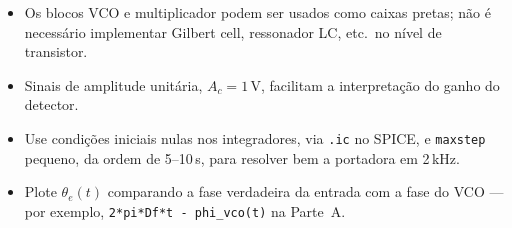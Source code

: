 \documentclass[11pt,a4paper]{article}
\begin{document}
\begin{atencao}[Observações]
\begin{itemize}[leftmargin=1.5em]
  \item Os blocos VCO e multiplicador podem ser usados como caixas pretas; não é necessário
        implementar Gilbert cell, ressonador LC, etc.\ no nível de transistor.
  \item Sinais de amplitude unitária, $A_c=1$\,V, facilitam a interpretação do ganho do detector.
  \item Use condições iniciais nulas nos integradores, via \texttt{.ic} no SPICE, e
        \texttt{maxstep} pequeno, da ordem de 5--10\,\textmu s, para resolver bem a portadora em 2\,kHz.
  \item Plote $\theta_e(t)$ comparando a fase verdadeira da entrada com a fase do VCO ---
        por exemplo, \texttt{2*pi*Df*t - phi\_vco(t)} na Parte~A.
\end{itemize}
\end{atencao}
\end{document}
